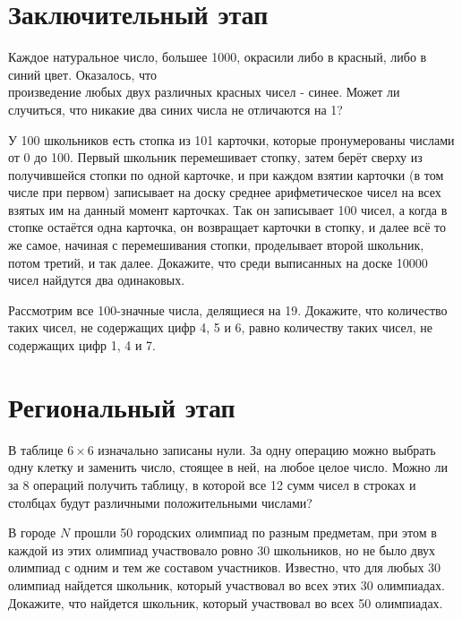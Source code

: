 \documentclass[11pt, a4paper]{common/document_template}
\begin{document}
\section{Заключительный этап}

\begin{exercise}
Каждое натуральное число, большее 1000, окрасили либо в красный, либо в синий цвет. Оказалось, что \\ произведение любых двух различных красных чисел - синее. Может ли случиться, что никакие два синих числа не отличаются на 1?
\end{exercise}

\begin{exercise}
У 100 школьников есть стопка из 101 карточки, которые пронумерованы числами от 0 до 100. Первый школьник перемешивает стопку, затем берёт сверху из получившейся стопки по одной карточке, и при каждом взятии карточки (в том числе при первом) записывает на доску среднее арифметическое чисел на всех взятых им на данный момент карточках. Так он записывает 100 чисел, а когда в стопке остаётся одна карточка, он возвращает карточки в стопку, и далее всё то же самое, начиная с перемешивания стопки,
проделывает второй школьник, потом третий, и так далее. Докажите, что среди выписанных на доске 10000 чисел найдутся два одинаковых.
\end{exercise}

\begin{exercise}
Рассмотрим все 100-значные числа, делящиеся на 19. Докажите, что количество таких чисел, не содержащих цифр 4, 5 и 6, равно количеству таких чисел, не содержащих цифр 1, 4 и 7.
\end{exercise}

\section{Региональный этап}

\begin{exercise}
В таблице $6 \times 6$ изначально записаны нули. За одну операцию можно выбрать одну клетку и заменить число, стоящее в ней, на любое целое число. Можно ли за 8 операций получить таблицу,
в которой все 12 сумм чисел в строках и столбцах будут различными положительными числами?
\end{exercise}

\begin{exercise}
В городе $N$ прошли 50 городских олимпиад по разным предметам, при этом в каждой из этих олимпиад участвовало ровно 30 школьников, но не было двух олимпиад с одним и тем же составом участников. Известно, что для любых 30 олимпиад найдется школьник, который участвовал во всех этих 30 олимпиадах. Докажите, что найдется школьник, который участвовал во всех 50 олимпиадах.
\end{exercise}
\end{document}
